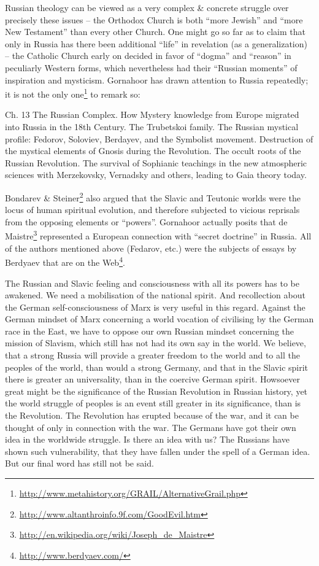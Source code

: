 Russian theology can be viewed as a very complex \& concrete struggle over precisely these issues -- the Orthodox Church is both ``more Jewish'' and ``more New Testament'' than every other Church. One might go so far as to claim that only in Russia has there been additional ``life'' in revelation (as a generalization) -- the Catholic Church early on decided in favor of ``dogma'' and ``reason'' in peculiarly Western forms, which nevertheless had their ``Russian moments'' of inspiration and mysticism. Gornahoor has drawn attention to Russia repeatedly; it is not the only one\footnote{\url{http://www.metahistory.org/GRAIL/AlternativeGrail.php}} to remark so:

\begin{quotex}
Ch. 13 The Russian Complex. How Mystery knowledge from Europe migrated into Russia in the 18th Century. The Trubetskoi family. The Russian mystical profile: Fedorov, Soloviev, Berdayev, and the Symbolist movement. Destruction of the mystical elements of Gnosis during the Revolution. The occult roots of the Russian Revolution. The survival of Sophianic teachings in the new atmospheric sciences with Merzekovsky, Vernadsky and others, leading to Gaia theory today.
\end{quotex}

Bondarev \& Steiner\footnote{\url{http://www.altanthroinfo.9f.com/GoodEvil.htm}} also argued that the Slavic and Teutonic worlds were the locus of human spiritual evolution, and therefore subjected to vicious reprisals from the opposing elements or ``powers''. Gornahoor actually posits that de Maistre\footnote{\url{http://en.wikipedia.org/wiki/Joseph\_de\_Maistre}} represented a European connection with ``secret doctrine'' in Russia. All of the authors mentioned above (Fedarov, etc.) were the subjects of essays by Berdyaev that are on the Web\footnote{\url{http://www.berdyaev.com/}}.

\begin{quotex}
The Russian and Slavic feeling and consciousness with all its powers has to be awakened. We need a mobilisation of the national spirit. And recollection about the German self-consciousness of Marx is very useful in this regard. Against the German mindset of Marx concerning a world vocation of civilising by the German race in the East, we have to oppose our own Russian mindset concerning the mission of Slavism, which still has not had its own say in the world. We believe, that a strong Russia will provide a greater freedom to the world and to all the peoples of the world, than would a strong Germany, and that in the Slavic spirit there is greater an universality, than in the coercive German spirit. Howsoever great might be the significance of the Russian Revolution in Russian history, yet the world struggle of peoples is an event still greater in its significance, than is the Revolution. The Revolution has erupted because of the war, and it can be thought of only in connection with the war. The Germans have got their own idea in the worldwide struggle. Is there an idea with us? The Russians have shown such vulnerability, that they have fallen under the spell of a German idea. But our final word has still not be said.
\end{quotex}


